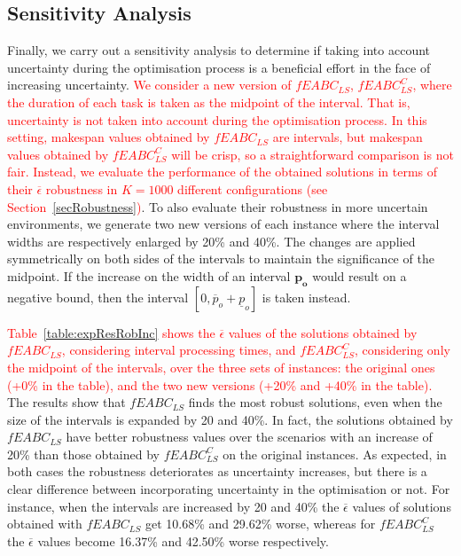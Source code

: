 \documentclass[sn-mathphys]{sn-jnl}%
\theoremstyle{thmstyleone}%
\theoremstyle{thmstyletwo}%
\theoremstyle{thmstylethree}%
\newcommand{\review}[1]{\textcolor{red}{#1}} %
\begin{document}
\subsection{Sensitivity Analysis}
Finally, we carry out a sensitivity analysis to determine if taking into account uncertainty during the optimisation process is a beneficial effort in the face of increasing uncertainty. \review{We consider a new version of $fEABC_{LS}$, $fEABC_{LS}^C$, where the duration of each task is taken as the midpoint of the interval. That is, uncertainty is not taken into account during the optimisation process. In this setting, makespan values obtained by $fEABC_{LS}$ are intervals, but makespan values obtained by $fEABC_{LS}^C$ will be crisp, so a straightforward comparison is not fair. Instead, we evaluate the performance of the obtained solutions in terms of their $\overline{\epsilon}$ robustness in $K=1000$ different configurations (see Section~\ref{secRobustness})}. To also evaluate their robustness in more uncertain environments, we generate two new versions of each instance where the interval widths are respectively enlarged by 20\% and 40\%. The changes are applied symmetrically on both sides of the intervals to maintain the significance of the midpoint. If the increase on the width of an interval $\mathbf{p_o}$ would result on a negative bound, then the interval $[0, \overline{p}_o+\underline{p}_o]$ is taken instead.

\review{Table~\ref{table:expResRobInc} shows the $\overline{\epsilon}$ values of the solutions obtained by $fEABC_{LS}$, considering interval processing times, and $fEABC_{LS}^C$, considering only the midpoint of the intervals, over the three sets of instances: the original ones (+0\% in the table), and the two new versions (+20\% and +40\% in the table).} The results show that $fEABC_{LS}$ finds the most robust solutions, even when the size of the intervals is expanded by 20 and 40\%. In fact, the solutions obtained by $fEABC_{LS}$ have better robustness values over the scenarios with an increase of 20\% than those obtained by $fEABC_{LS}^C$ on the original instances. As expected, in both cases the robustness deteriorates as uncertainty increases, but there is a clear difference between incorporating uncertainty in the optimisation or not. For instance, when the intervals are increased by 20 and 40\% the $\overline{\epsilon}$ values of solutions obtained with $fEABC_{LS}$ get 10.68\% and 29.62\% worse, whereas for $fEABC_{LS}^C$ the $\overline{\epsilon}$ values become 16.37\% and 42.50\% worse respectively.
\end{document}
